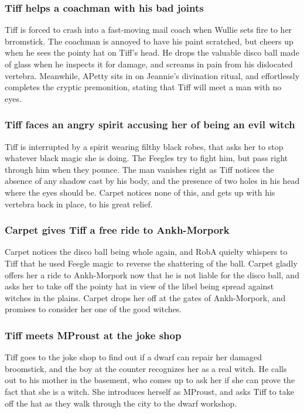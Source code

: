 \subsubsection{\Gls{Tiff} helps a coachman with his bad joints}
\Gls{Tiff} is forced to crash into a fast-moving mail coach when \Gls{Wullie} sets fire to her
brromstick. The coachman is annoyed to have his paint scratched, but cheers up when he sees
the pointy hat on \Gls{Tiff}'s head. He drops the valuable disco ball made of glass when he inspects
it for damage, and screams in pain from his dislocated vertebra. Meanwhile, \Gls{APetty} sits in on
\Gls{Jeannie}'s divination ritual, and effortlessly completes the cryptic premonition, stating that
\Gls{Tiff} will meet a man with no eyes.

\subsubsection{\Gls{Tiff} faces an angry spirit accusing her of being an evil witch}
\Gls{Tiff} is interrupted by a spirit wearing filthy black robes, that asks her to stop whatever
black magic she is doing. The Feegles try to fight him, but pass right through him when they
pounce. The man vanishes right as \Gls{Tiff} notices the absence of any shadow cast by his body, and
the presence of two holes in his head where the eyes should be. \Gls{Carpet} notices none of this,
and gets up with his vertebra back in place, to his great relief.

\subsubsection{\Gls{Carpet} gives \Gls{Tiff} a free ride to Ankh-Morpork}
\Gls{Carpet} notices the disco ball being whole again, and \Gls{RobA} quielty whispers to \Gls{Tiff}
that he used Feegle magic to reverse the shattering of the ball. \Gls{Carpet} gladly offers her a
ride to Ankh-Morpork now that he is not liable for the disco ball, and asks her to take off the
pointy hat in view of the libel being spread against witches in the plains. \Gls{Carpet} drops her
off at the gates of Ankh-Morpork, and promises to consider her one of the good witches.

\subsubsection{\Gls{Tiff} meets \Gls{MProust} at the joke shop}
\Gls{Tiff} goes to the joke shop to find out if a dwarf can repair her damaged broomstick, and the
boy at the counter recognizes her as a real witch. He calls out to his mother in the basement, who
comes up to ask her if she can prove the fact that she is a witch. She introduces herself as
\Gls{MProust}, and asks \Gls{Tiff} to take off the hat as they walk through the city to the dwarf
workshop.

